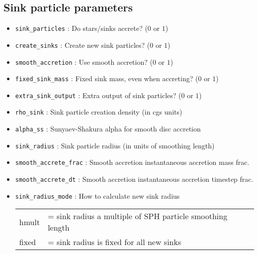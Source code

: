 \documentclass[a4paper]{article}
\newcommand{\var}[1]{\texttt{#1}}
\begin{document}
\subsection{Sink particle parameters}

\begin{itemize}

\item \var{sink\_particles}   : Do stars/sinks accrete?  ($0$ or $1$)

\item \var{create\_sinks}     : Create new sink particles?  ($0$ or $1$)

\item \var{smooth\_accretion} : Use smooth accretion?  ($0$ or $1$)

\item \var{fixed\_sink\_mass} : Fixed sink mass, even when accreting? ($0$ or $1$)

\item \var{extra\_sink\_output} : Extra output of sink particles? ($0$ or $1$)

\item \var{rho\_sink}         : Sink particle creation density (in cgs units)

\item \var{alpha\_ss}         : Sunyaev-Shakura alpha for smooth disc accretion

\item \var{sink\_radius}      : Sink particle radius (in units of smoothing length)

\item \var{smooth\_accrete\_frac} : Smooth accretion instantaneous accretion mass frac.

\item \var{smooth\_accrete\_dt} : Smooth accretion instantaneous accretion timestep frac.

\item \var{sink\_radius\_mode} : How to calculate new sink radius \\
\begin{tabular}{ll}
hmult   & = sink radius a multiple of SPH particle smoothing length \\
fixed   & = sink radius is fixed for all new sinks \\
\end{tabular}


\end{itemize}
\end{document}
